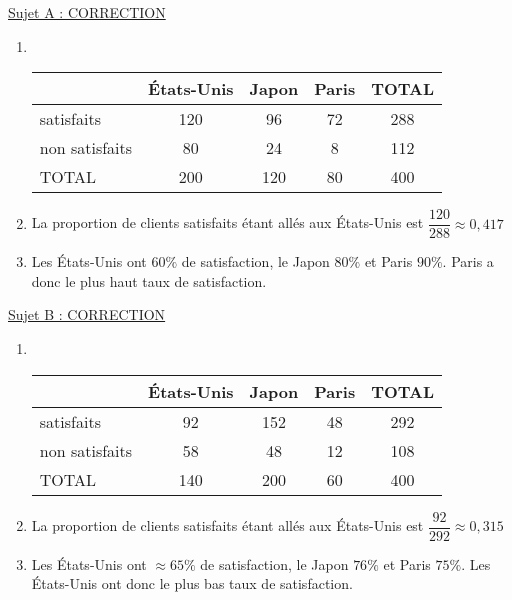 \documentclass{beamer}
\begin{document}
\begin{frame}
	\small\color{red}
	\uline{Sujet A : CORRECTION}

	\begin{enumerate}
		\item \

		      \begin{tabular}{|l|c|c|c|c|}
			      \hline
			                     & États-Unis & Japon & Paris & TOTAL \\ \hline
			      satisfaits     & 120        & 96    & 72    & 288   \\ \hline
			      non satisfaits & 80         & 24    & 8     & 112   \\ \hline
			      TOTAL          & 200        & 120   & 80    & 400   \\ \hline
		      \end{tabular}
		\item La proportion de clients satisfaits étant allés aux États-Unis est $\dfrac{120}{288} ≈ 0,417$
		\item Les États-Unis ont $60\%$ de satisfaction, le Japon $80\%$ et Paris $90\%$. Paris a donc le plus haut taux de satisfaction.
	\end{enumerate}
\end{frame}

\begin{frame}
	\small\color{red}
	\uline{Sujet B : CORRECTION}

	\begin{enumerate}
		\item \

		      \begin{tabular}{|l|c|c|c|c|}
			      \hline
			                     & États-Unis & Japon & Paris & TOTAL \\ \hline
			      satisfaits     & 92         & 152   & 48    & 292   \\ \hline
			      non satisfaits & 58         & 48    & 12    & 108   \\ \hline
			      TOTAL          & 140        & 200   & 60    & 400   \\ \hline
		      \end{tabular}
		\item La proportion de clients satisfaits étant allés aux États-Unis est $\dfrac{92}{292} ≈ 0,315$
		\item Les États-Unis ont $≈65\%$ de satisfaction, le Japon $76\%$ et Paris $75\%$. Les États-Unis ont donc le plus bas taux de satisfaction.
	\end{enumerate}
\end{frame}
\end{document}
